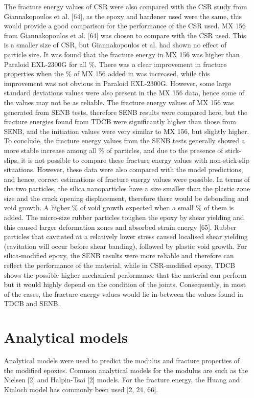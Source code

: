 \documentclass[numbers=noendperiod,chapterprefix=on]{icldt} %
\begin{document}
The fracture energy values of CSR were also compared with the CSR study from Giannakopoulos et al. [64], as the epoxy and hardener used were the same, this would provide a good comparison for the performance of the CSR used. 
MX 156 from Giannakopoulos et al. [64] was chosen to compare with the CSR used. This is a smaller size of CSR, but Giannakopoulos et al. had shown no effect of particle size. It was found that the fracture energy in MX 156 was higher than Paraloid EXL-2300G for all \%. There was a clear improvement in fracture properties when the \% of MX 156 added in was increased, while this improvement was not obvious in Paraloid EXL-2300G. However, some large standard deviations values were also present in the MX 156 data, hence some of the values may not be as reliable. The fracture energy values of MX 156 was generated from SENB tests, therefore SENB results were compared here, but the fracture energies found from TDCB were significantly higher than those from SENB, and the initiation values were very similar to MX 156, but slightly higher. 
To conclude, the fracture energy values from the SENB tests generally showed a more stable increase among all \% of particles, and due to the presence of stick-slips, it is not possible to compare these fracture energy values with non-stick-slip situations. However, these data were also compared with the model predictions, and hence, correct estimations of fracture energy values were possible. 
In terms of the two particles, the silica nanoparticles have a size smaller than the plastic zone size and the crack opening displacement, therefore there would be debonding and void growth. A higher \% of void growth expected when a small \% of them is added. 
The micro-size rubber particles toughen the epoxy by shear yielding and this caused larger deformation zones and absorbed strain energy [65]. Rubber particles that cavitated at a relatively lower stress caused localised shear yielding (cavitation will occur before shear banding), followed by plastic void growth. 
For silica-modified epoxy, the SENB results were more reliable and therefore can reflect the performance of the material, while in CSR-modified epoxy, TDCB shows the possible higher mechanical performance that the material can perform but it would highly depend on the condition of the joints. Consequently, in most of the cases, the fracture energy values would lie in-between the values found in TDCB and SENB.

\section{Analytical models}
Analytical models were used to predict the modulus and fracture properties of the modified epoxies. Common analytical models for the modulus are such as the Nielsen [2] and Halpin-Tsai [2] models. For the fracture energy, the Huang and Kinloch model has commonly been used [2, 24, 66].
\end{document}

